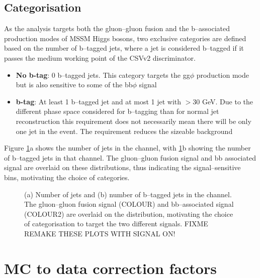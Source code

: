 \subsection{Categorisation}
\label{sec:mssm_eventsel_categories}
As the analysis targets both the gluon--gluon fusion
and the b--associated production modes of MSSM Higgs
bosons, two exclusive categories are defined based on the 
number of b--tagged jets, where a jet is considered b--tagged
if it passes the medium working point of the \ac{CSV}v2 discriminator. 
\begin{itemize}
\setlength{\itemsep}{-\baselineskip}
\item \textbf{No b-tag}: 0 b--tagged jets. This category targets the gg$\phi$ production mode but is also sensitive to some of the bb$\phi$ signal
\item \textbf{b-tag}: At least 1 b--tagged jet and at most 1 
jet with \pT$>30$ GeV. Due to the different phase space considered for
b--tagging than for normal jet reconstruction this requirement does not necessarily
mean there will be only one jet in the event. The requirement reduces the sizeable \ttbar
background
\end{itemize}

Figure \ref{fig:mssm_cats_tt}a shows the number of jets 
in the \tautau channel, with \ref{fig:mssm_cats_tt}b showing
the number of b--tagged jets in that channel. The gluon--gluon fusion
signal and bb associated signal are overlaid on these distributions,
thus indicating the signal--sensitive bins, motivating the choice of categories.

\begin{figure}[h!]
\begin{center}
\end{center}
\caption{(a) Number of jets and (b) number of b--tagged jets in the \tautau channel. The gluon--gluon fusion signal (COLOUR)
and bb--associated signal (COLOUR2) are overlaid on the distribution, motivating the choice of
categorisation to target the two different signals. FIXME REMAKE THESE PLOTS WITH SIGNAL ON!}
\label{fig:mssm_cats_tt}
\end{figure}


\section{\ac{MC} to data correction factors}
\label{sec:mssm_mccorrs}
